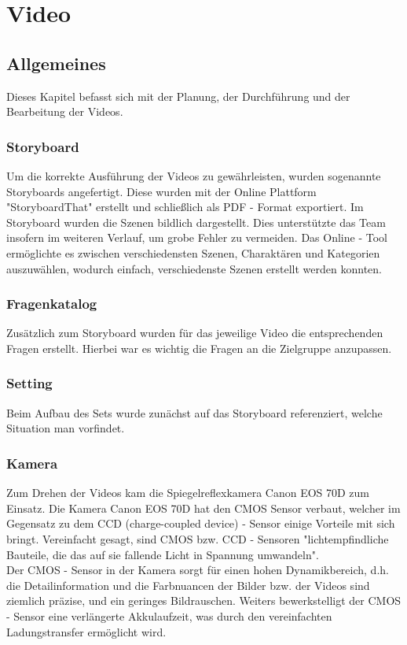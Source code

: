 \chapter{Video}
\section{Allgemeines}
\renewcommand{\kapitelautor}{Autor: Kerstin Schön}
Dieses Kapitel befasst sich mit der Planung, der Durchführung und der Bearbeitung der Videos. 

\subsection{Storyboard}
\renewcommand{\kapitelautor}{Autor: Kerstin Schön}
Um die korrekte Ausführung der Videos zu gewährleisten, wurden sogenannte Storyboards angefertigt. Diese wurden mit der Online Plattform "StoryboardThat" erstellt und schließlich als PDF - Format exportiert.
Im Storyboard wurden die Szenen bildlich dargestellt. Dies unterstützte das Team insofern im weiteren Verlauf, um grobe Fehler zu vermeiden.
Das Online - Tool ermöglichte es zwischen verschiedensten Szenen, Charaktären und Kategorien auszuwählen, wodurch einfach, verschiedenste Szenen erstellt werden konnten.
 
\subsection{Fragenkatalog}
\renewcommand{\kapitelautor}{Autor: Kerstin Schön}
Zusätzlich zum Storyboard wurden für das jeweilige Video die entsprechenden Fragen erstellt. Hierbei war es wichtig die Fragen an die Zielgruppe anzupassen. 

\subsection{Setting}
Beim Aufbau des Sets wurde zunächst auf das Storyboard referenziert, welche Situation man vorfindet.

\subsection{Kamera}
Zum Drehen der Videos kam die Spiegelreflexkamera Canon EOS 70D zum Einsatz. Die Kamera Canon EOS 70D hat den CMOS Sensor verbaut, welcher im Gegensatz zu dem CCD (charge-coupled device) - Sensor einige Vorteile mit sich bringt. Vereinfacht gesagt, sind CMOS bzw. CCD - Sensoren "lichtempfindliche Bauteile, die das auf sie fallende Licht in Spannung umwandeln". \\
Der CMOS - Sensor in der Kamera sorgt für einen hohen Dynamikbereich, d.h. die Detailinformation und die Farbnuancen der Bilder bzw. der Videos sind ziemlich präzise, und ein geringes Bildrauschen. Weiters bewerkstelligt der CMOS - Sensor eine verlängerte Akkulaufzeit, was durch den vereinfachten Ladungstransfer ermöglicht wird.

